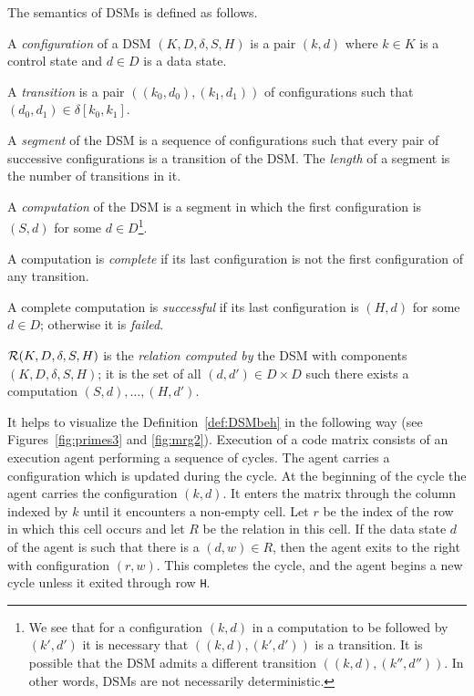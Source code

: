 \documentclass[preprint,11pt]{elsarticle}
\begin{document}
The semantics of DSMs is defined as follows.\\[-6mm]
\begin{definition}
\label{def:DSMbeh}
A \emph{configuration} of a DSM $(K,D,\delta,S,H)$
is a pair $(k,d)$ where $k \in K$ is a control state
and $d \in D$ is a data state.

A \emph{transition} is a pair
$((k_0,d_0),(k_1,d_1))$ of configurations
such that $(d_0,d_1) \in \delta[k_0,k_1]$.

A \emph{segment} of the DSM is a sequence of configurations
such that every pair of successive configurations
is a transition of the DSM.
The \emph{length} of a segment is the number of transitions in it.

A \emph{computation} of the DSM is a segment in which
the first configuration is $(S,d)$ for some $d \in D$\/\footnote{
We see that for a configuration $(k,d)$ in a computation
to be followed by $(k',d')$ it is necessary that
$((k,d),(k',d'))$ is a transition.
It is possible that the DSM admits a different transition
$((k,d),(k'',d''))$.
In other words, DSMs are not necessarily deterministic. 
}.

A computation is \emph{complete} if its last configuration
is not the first configuration of any transition.

A complete computation is \emph{successful} if its last
configuration is $(H,d)$ for some $d \in D$;
otherwise it is \emph{failed}.

$\mathcal{R}(K,D,\delta,S,H)$
is the \emph{relation computed by}
the DSM with components $(K,D,\delta,S,H)$;
it is the set of all $(d,d') \in D\times D$
such there exists a
computation $(S,d),\ldots,(H,d')$.

\end{definition}

It helps to visualize the
Definition~\ref{def:DSMbeh} in the following way
(see Figures~\ref{fig:primes3} and \ref{fig:mrg2}).
Execution of a code matrix consists of 
an execution agent performing a sequence of cycles.
The agent carries a configuration
which is updated during the cycle.
At the beginning of the cycle the agent
carries the configuration $(k,d)$.
It enters the matrix
through the column indexed by $k$
until it encounters a non-empty cell.
Let $r$ be the index of the row in which this cell occurs
and let $R$ be the relation in this cell.
If the data state $d$ of the agent is such that
there is a $(d,w) \in R$,
then the agent exits to the right with configuration
$(r,w)$.
This completes the cycle,
and the agent begins a new cycle
unless it exited through row \verb"H".
\end{document}
